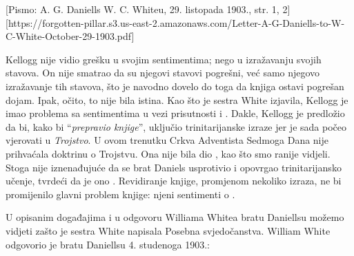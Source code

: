 
[Pismo: A. G. Daniells W. C. Whiteu, 29. listopada 1903., str. 1, 2][https://forgotten-pillar.s3.us-east-2.amazonaws.com/Letter-A-G-Daniells-to-W-C-White-October-29-1903.pdf]

Kellogg nije vidio grešku u svojim sentimentima; nego u izražavanju svojih stavova. On nije smatrao da su njegovi stavovi pogrešni, već samo njegovo izražavanje tih stavova, što je navodno dovelo do toga da knjiga ostavi pogrešan dojam. Ipak, očito, to nije bila istina. Kao što je sestra White izjavila, Kellogg je imao problema sa sentimentima u vezi prisutnosti i . Dakle, Kellogg je predložio da bi, kako bi “\textit{prepravio knjige}”, uključio trinitarijanske izraze jer je sada počeo vjerovati u \textit{Trojstvo}. U ovom trenutku Crkva Adventista Sedmoga Dana nije prihvaćala doktrinu o Trojstvu. Ona nije bila dio , kao što smo ranije vidjeli. Stoga nije iznenađujuće da se brat Daniels usprotivio i opovrgao trinitarijansko učenje, tvrdeći da je ono . Revidiranje knjige, promjenom nekoliko izraza, ne bi promijenilo glavni problem knjige: njeni sentimenti o .

U opisanim događajima i u odgovoru Williama Whitea bratu Daniellsu možemo vidjeti zašto je sestra White napisala Posebna svjedočanstva. William White odgovorio je bratu Daniellsu 4. studenoga 1903.:




